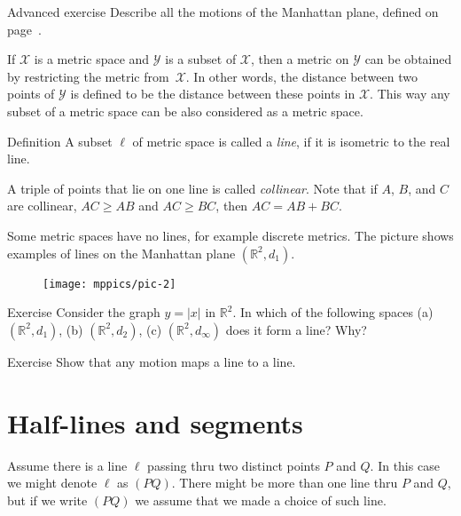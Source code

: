 \begin{thm}{Advanced exercise}\label{ad-ex:motions of Manhattan plane}
Describe all the motions of the Manhattan plane, defined on page~\pageref{Manhattan plane}.
\end{thm}

If $\mathcal X$ is a metric space and $\mathcal Y$ is a subset of $\mathcal X$,
then a metric on $\mathcal Y$ can be obtained by restricting the metric from~$\mathcal X$. 
In other words, 
the distance between two points of $\mathcal Y$ is defined to be the distance between these points in $\mathcal X$.
This way any subset of a metric space can be also considered as a metric space. 

\begin{thm}{Definition}\label{def:line}
A subset $\ell$ of metric space is called a \emph{line}, if it is isometric to the real line.
\end{thm}

A triple of points that lie on one line is called \emph{collinear}.
Note that if $A$, $B$, and  $C$ are  collinear, $AC\ge AB$ and $AC\ge BC$, then $AC= AB+BC$.

Some metric spaces have no lines, for example discrete metrics.
The picture shows examples of lines on the Manhattan plane $(\mathbb{R}^2,d_1)$. 
\begin{figure}[h!]
\centering
\texttt{[image: mppics/pic-2]}
\end{figure}

\begin{thm}{Exercise}\label{ex:y=|x|}
Consider the graph $y=|x|$ in $\mathbb{R}^2$.
In which of the following spaces 
(a) $(\mathbb{R}^2,d_1)$, 
(b) $(\mathbb{R}^2,d_2)$, 
(c) $(\mathbb{R}^2,d_\infty)$ 
does it form a line? 
Why?
\end{thm}

\begin{thm}{Exercise}\label{ex:line-motion}
Show that any motion maps a line to a line. 
\end{thm}

\section*{Half-lines and segments}

Assume there is a line $\ell$ passing thru
two distinct points $P$ and $Q$.
In this case we might denote $\ell$ as $(PQ)$.
There might be more than one line thru $P$ and $Q$,
but if we write \index{60@$(PQ)$, $[PQ)$, $[PQ]$}$(PQ)$ we assume that we made a choice of such line. 

